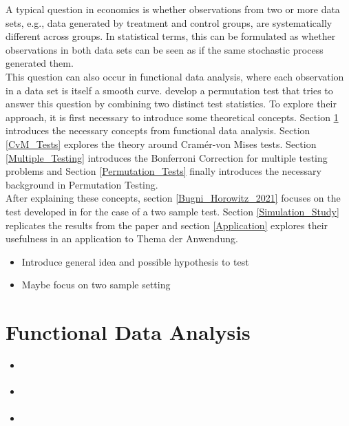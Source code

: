 \documentclass[11pt,twoside,a4paper]{article}
\theoremstyle{MAstyle} \newtheorem{assumption}{Assumption}
\theoremstyle{MAstyle} \newtheorem{definition}{Definition}
\begin{document}
		A typical question in economics is whether observations from two or more data sets, e.g., data generated by treatment and control groups, are systematically different across groups. In statistical terms, this can be formulated as whether observations in both data sets can be seen as if the same stochastic process generated them.\\
		
		This question can also occur in functional data analysis, where each observation in a data set is itself a smooth curve. \cite{bugni_permutation_2021} develop a permutation test that tries to answer this question by combining two distinct test statistics. To explore their approach, it is first necessary to introduce some theoretical concepts.
		Section \ref{FDA} introduces the necessary concepts from functional data analysis. Section \ref{CvM_Tests} explores the theory around Cram\'{e}r-von Mises tests. Section \ref{Multiple_Testing} introduces the Bonferroni Correction for multiple testing problems and Section \ref{Permutation_Tests} finally introduces the necessary background in Permutation Testing.\\
		After explaining these concepts, section \ref{Bugni_Horowitz_2021} focuses on the test developed in \cite{bugni_permutation_2021} for the case of a two sample test. Section \ref{Simulation_Study} replicates the results from the paper and section \ref{Application} explores their usefulness in an application to {\color{red} Thema der Anwendung}.
		
		
		
		\begin{itemize}
			\item Introduce general idea and possible hypothesis to test
			\item Maybe focus on two sample setting
		\end{itemize}
	
	\section{Functional Data Analysis}\label{FDA}
		\begin{itemize}
			\item \cite{ramsay_functional_2005}
			\item \cite{kokoszka_introduction_2021}
			\item \cite{hsing_theoretical_2015}
		\end{itemize}
	
\end{document}
